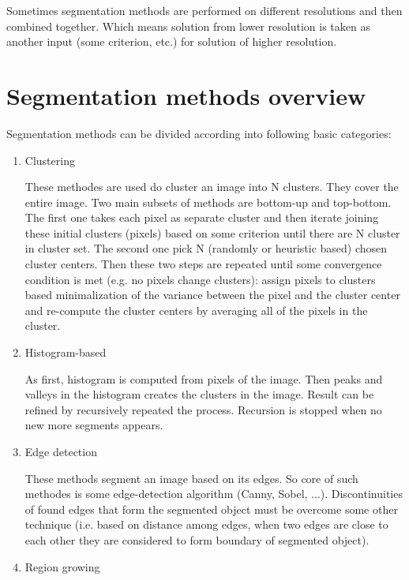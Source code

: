 Sometimes segmentation methods are performed on different resolutions and then combined together.
Which means solution from lower resolution is taken as another input (some criterion, etc.) for solution of higher resolution.

\section{Segmentation methods overview}

Segmentation methods can be divided according \cite{wiki} into following basic categories:

\begin{enumerate}

  \item Clustering

  These methodes are used do cluster an image into N clusters.
They cover the entire image.
Two main subsets of methods are bottom-up and top-bottom.
The first one takes each pixel as separate cluster and then iterate joining these initial clusters (pixels) based on some criterion until there are N cluster in cluster set.
The second one pick N (randomly or heuristic based) chosen cluster centers.
Then these two steps are repeated until some convergence condition is met (e.g. no pixels change clusters): assign pixels to clusters based minimalization of the variance between the pixel and the cluster center and re-compute the cluster centers by averaging all of the pixels in the cluster.

  \item Histogram-based

  As first, histogram is computed from pixels of the image.
Then peaks and valleys in the histogram creates the clusters in the image.
Result can be refined by recursively repeated the process.
Recursion is stopped when no new more segments appears.

  \item Edge detection

  These methods segment an image based on its edges.
So core of such methodes is some edge-detection algorithm (Canny, Sobel, ...).
Discontinuities of found edges that form the segmented object must be overcome some other technique (i.e. based on distance among edges, when two edges are close to each other they are considered to form boundary of segmented object).

  \item Region growing


\end{enumerate}
